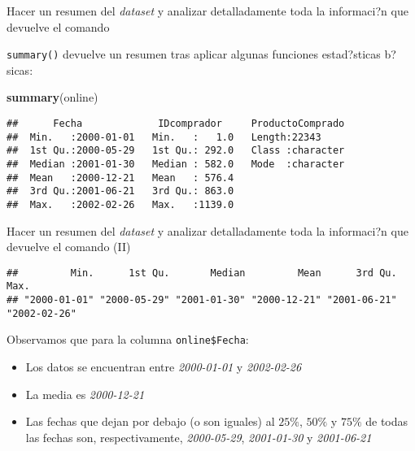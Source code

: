\documentclass[
  ignorenonframetext,
]{beamer}
\newenvironment{Shaded}{\begin{snugshade}}{\end{snugshade}}
\newcommand{\KeywordTok}[1]{\textcolor[rgb]{0.13,0.29,0.53}{\textbf{#1}}}
\newcommand{\NormalTok}[1]{#1}
\newcommand{\OperatorTok}[1]{\textcolor[rgb]{0.81,0.36,0.00}{\textbf{#1}}}
\providecommand{\tightlist}{%
  \setlength{\itemsep}{0pt}\setlength{\parskip}{0pt}}
\begin{document}
\begin{frame}[fragile]{Hacer un resumen del \emph{dataset} y analizar
detalladamente toda la informaci?n que devuelve el comando}
\protect\hypertarget{hacer-un-resumen-del-dataset-y-analizar-detalladamente-toda-la-informacin-que-devuelve-el-comando}{}

\texttt{summary()} devuelve un resumen tras aplicar algunas funciones
estad?sticas b?sicas:

\begin{Shaded}
\begin{Highlighting}[]
\KeywordTok{summary}\NormalTok{(online)}
\end{Highlighting}
\end{Shaded}

\begin{verbatim}
##      Fecha             IDcomprador     ProductoComprado  
##  Min.   :2000-01-01   Min.   :   1.0   Length:22343      
##  1st Qu.:2000-05-29   1st Qu.: 292.0   Class :character  
##  Median :2001-01-30   Median : 582.0   Mode  :character  
##  Mean   :2000-12-21   Mean   : 576.4                     
##  3rd Qu.:2001-06-21   3rd Qu.: 863.0                     
##  Max.   :2002-02-26   Max.   :1139.0
\end{verbatim}

\end{frame}

\begin{frame}[fragile]{Hacer un resumen del \emph{dataset} y analizar
detalladamente toda la informaci?n que devuelve el comando (II)}
\protect\hypertarget{hacer-un-resumen-del-dataset-y-analizar-detalladamente-toda-la-informacin-que-devuelve-el-comando-ii}{}

\begin{Shaded}
\end{Shaded}

\begin{verbatim}
##         Min.      1st Qu.       Median         Mean      3rd Qu.         Max. 
## "2000-01-01" "2000-05-29" "2001-01-30" "2000-12-21" "2001-06-21" "2002-02-26"
\end{verbatim}

Observamos que para la columna \texttt{online\$Fecha}:

\begin{itemize}
\tightlist
\item
  Los datos se encuentran entre \emph{2000-01-01} y \emph{2002-02-26}
\item
  La media es \emph{2000-12-21}
\item
  Las fechas que dejan por debajo (o son iguales) al \(25\%\), \(50\%\)
  y \(75\%\) de todas las fechas son, respectivamente,
  \emph{2000-05-29}, \emph{2001-01-30} y \emph{2001-06-21}
\end{itemize}

\end{frame}
\end{document}

